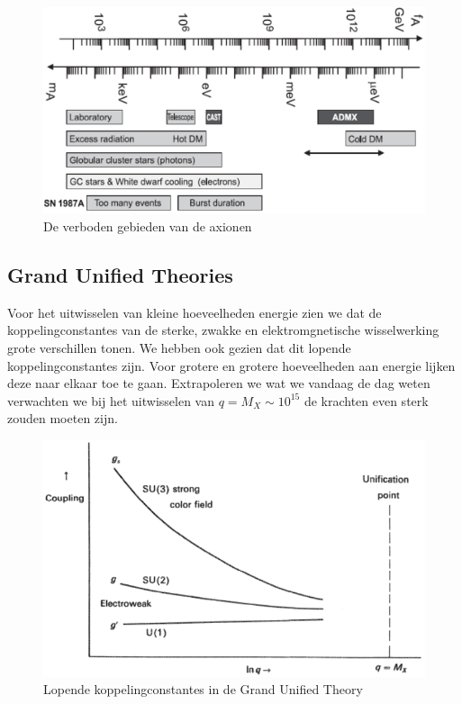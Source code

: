 \documentclass[../main.tex]{subfiles}
\begin{document}
\begin{figure}[h]
    \centering
    \includegraphics[width=0.6\linewidth]{physics_beyond_the_standard_model/axionen_verboden_gebieden.png}
    \caption{De verboden gebieden van de axionen}%
    \label{fig:physics_beyond_the_standard_model/axionen_verboden_gebieden}
\end{figure}

\subsection{Grand Unified Theories}%
\label{sub:grand_unified_theories}

Voor het uitwisselen van kleine hoeveelheden energie zien we dat de koppelingconstantes van de sterke, zwakke en elektromgnetische wisselwerking grote verschillen tonen. We hebben ook gezien dat dit lopende koppelingconstantes zijn. Voor grotere en grotere hoeveelheden aan energie lijken deze naar elkaar toe te gaan. Extrapoleren we wat we vandaag de dag weten verwachten we bij het uitwisselen van $q=M_{X} \sim 10^{15}$ de krachten even sterk zouden moeten zijn.

\begin{figure}[h]
    \centering
    \includegraphics[width=0.5\linewidth]{physics_beyond_the_standard_model/grand_unified_theory.png}
    \caption{Lopende koppelingconstantes in de Grand Unified Theory}%
    \label{fig:physics_beyond_the_standard_model/grand_unified_theory}
\end{figure}
\end{document}
